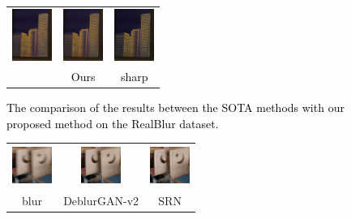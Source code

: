 \begin{sloppypar}
\begin{figure}
\begin{tabular}{ccc}
                \includegraphics[width=1.3cm]{./compare_image/blur1_AD.png} &
                \includegraphics[width=1.3cm]{./compare_image/ours1.png} &    \includegraphics[width=1.3cm]{./compare_image/GT1.png}       \\
                \textcolor{black}{\cite{26}} & \textcolor{black}{Ours} & \textcolor{black}{sharp}
                
        \end{tabular}
        \caption{\textcolor{black}{The comparison of the results between the SOTA  methods with our proposed method on the RealBlur dataset.}}
        \label{figure11}
        \vspace{-0.5em}
\end{figure}

\begin{figure}
        \center
        \scriptsize
        \begin{tabular}{ccc}
                \includegraphics[width=1.3cm,height=1.3cm]{./real/000003_blur_patch.png} &    \includegraphics[width=1.3cm,height=1.3cm]{./real/000003_blur_D-GAN2_patch.png} &    \includegraphics[width=1.3cm,height=1.3cm]{./real/000003_blur_SRN_patch.png}       \\
                blur & DeblurGAN-v2 & SRN \\
                

\end{tabular}
\end{figure}
\end{sloppypar}
